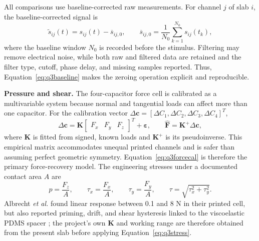 \vspace{0.35em}

\clearpage
{}

\hypertarget{q3-measurement-models}{}

{\fontsize{9.4}{11.1}\selectfont
All comparisons use baseline-corrected raw measurements. For channel $j$
of slab $i$, the baseline-corrected signal is
\begin{equation}
  \widetilde{s}_{ij}(t)=s_{ij}(t)-\overline{s}_{ij,0},
  \qquad
  \overline{s}_{ij,0}=\frac{1}{N_0}\sum_{k=1}^{N_0}s_{ij}(t_k),
  \label{eq:q3baseline}
\end{equation}
where the baseline window $N_0$ is recorded before the stimulus. Filtering may
remove electrical noise, while both raw and filtered data are retained and
the filter type, cutoff, phase delay, and missing samples reported. Thus,
Equation~\eqref{eq:q3baseline} makes the zeroing operation explicit and
reproducible.\par

\textbf{Pressure and shear.} The four-capacitor force cell is calibrated as a
multivariable system because normal and tangential loads can affect more than
one capacitor. For the calibration vector
$\Delta\mathbf c=[\Delta C_1,\Delta C_2,\Delta C_3,\Delta C_4]^T$,
\begin{equation}
  \Delta\mathbf c=\mathbf K
  \begin{bmatrix}F_x&F_y&F_z\end{bmatrix}^{T}+\boldsymbol\varepsilon,
  \qquad
  \widehat{\mathbf F}=\mathbf K^{+}\Delta\mathbf c,
  \label{eq:q3forcecal}
\end{equation}
where $\mathbf K$ is fitted from signed, known loads and $\mathbf K^{+}$ is its
pseudoinverse. This empirical matrix accommodates unequal printed channels and
is safer than assuming perfect geometric symmetry. Equation~\eqref{eq:q3forcecal}
is therefore the primary force-recovery model. The engineering stresses
under a documented contact area $A$ are
\begin{equation}
  p=\frac{F_z}{A},\qquad
  \tau_x=\frac{F_x}{A},\qquad
  \tau_y=\frac{F_y}{A},\qquad
  \tau=\sqrt{\tau_x^2+\tau_y^2}.
  \label{eq:q3stress}
\end{equation}
Albrecht \textit{et al.} found linear response between 0.1 and 8 N in their
printed cell, but also reported priming, drift, and shear hysteresis linked to
the viscoelastic PDMS spacer \cite{albrecht2019}; the project's own
$\mathbf K$ and working range are therefore obtained from the present slab
before applying
Equation~\eqref{eq:q3stress}.\par

}
